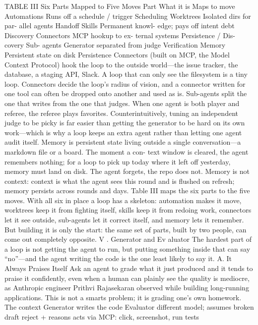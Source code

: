 \documentclass[conference]{IEEEtran}
\begin{document}

TABLE III
Six Parts Mapped to Five Moves
Part What it is Maps to move
Automations Runs off a schedule
/ trigger
Scheduling
Worktrees Isolated dirs for par-
allel agents
Handoff
Skills Permanent knowl-
edge; pays off intent
debt
Discovery
Connectors MCP hookup to ex-
ternal systems
Persistence / Dis-
covery
Sub-
agents
Generator separated
from judge
Verification
Memory Persistent state on
disk
Persistence
Connectors (built on MCP, the Model Context Protocol) hook
the loop to the outside world—the issue tracker, the database, a
staging API, Slack. A loop that can only see the filesystem is a
tiny loop. Connectors decide the loop’s radius of vision, and a
connector written for one tool can often be dropped onto another
and used as is.
Sub-agents split the one that writes from the one that judges.
When one agent is both player and referee, the referee plays
favorites. Counterintuitively, tuning an independent judge to be
picky is far easier than getting the generator to be hard on its
own work—which is why a loop keeps an extra agent rather than
letting one agent audit itself.
Memory is persistent state living outside a single
conversation—a markdown file or a board. The moment a con-
text window is cleared, the agent remembers nothing; for a loop
to pick up today where it left off yesterday, memory must land
on disk. The agent forgets, the repo does not. Memory is not
context: context is what the agent sees this round and is flushed
on refresh; memory persists across rounds and days. Table III
maps the six parts to the five moves.
With all six in place a loop has a skeleton: automation makes
it move, worktrees keep it from fighting itself, skills keep it
from redoing work, connectors let it see outside, sub-agents let
it correct itself, and memory lets it remember. But building it
is only the start: the same set of parts, built by two people, can
come out completely opposite.
V . Generator and Ev aluator
The hardest part of a loop is not getting the agent to run,
but putting something inside that can say “no”—and the agent
writing the code is the one least likely to say it.
A. It Always Praises Itself
Ask an agent to grade what it just produced and it tends to
praise it confidently, even when a human can plainly see the
quality is mediocre, as Anthropic engineer Prithvi Rajasekaran
observed while building long-running applications. This is not a
smarts problem; it is grading one’s own homework. The context
Generator
writes the code
Evaluator
different model;
assumes broken
draft
reject + reasons
acts via MCP: click, screenshot, run tests
\end{document}
